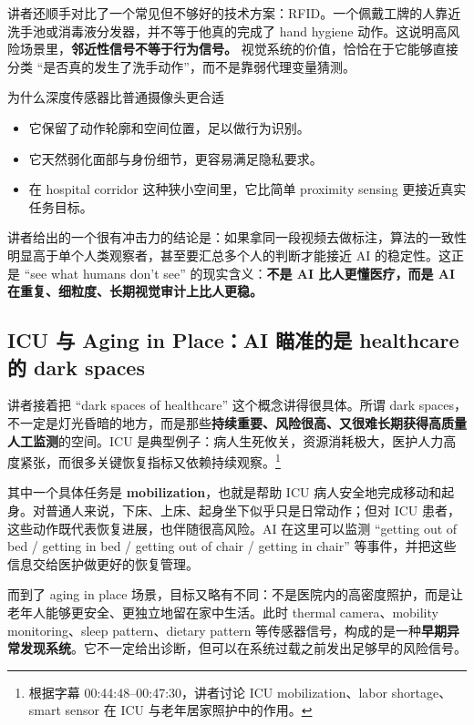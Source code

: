 讲者还顺手对比了一个常见但不够好的技术方案：RFID。一个佩戴工牌的人靠近洗手池或消毒液分发器，并不等于他真的完成了 hand hygiene 动作。这说明高风险场景里，\textbf{邻近性信号不等于行为信号。} 视觉系统的价值，恰恰在于它能够直接分类 ``是否真的发生了洗手动作''，而不是靠弱代理变量猜测。

\begin{importantbox}{为什么深度传感器比普通摄像头更合适}
\begin{itemize}
    \item 它保留了动作轮廓和空间位置，足以做行为识别。
    \item 它天然弱化面部与身份细节，更容易满足隐私要求。
    \item 在 hospital corridor 这种狭小空间里，它比简单 proximity sensing 更接近真实任务目标。
\end{itemize}
\end{importantbox}

讲者给出的一个很有冲击力的结论是：如果拿同一段视频去做标注，算法的一致性明显高于单个人类观察者，甚至要汇总多个人的判断才能接近 AI 的稳定性。这正是 ``see what humans don't see'' 的现实含义：\textbf{不是 AI 比人更懂医疗，而是 AI 在重复、细粒度、长期视觉审计上比人更稳。}

\subsection{ICU 与 Aging in Place：AI 瞄准的是 healthcare 的 dark spaces}

讲者接着把 ``dark spaces of healthcare'' 这个概念讲得很具体。所谓 dark spaces，不一定是灯光昏暗的地方，而是那些\textbf{持续重要、风险很高、又很难长期获得高质量人工监测}的空间。ICU 是典型例子：病人生死攸关，资源消耗极大，医护人力高度紧张，而很多关键恢复指标又依赖持续观察。\footnote{根据字幕 00:44:48--00:47:30，讲者讨论 ICU mobilization、labor shortage、smart sensor 在 ICU 与老年居家照护中的作用。}

其中一个具体任务是 \textbf{mobilization}，也就是帮助 ICU 病人安全地完成移动和起身。对普通人来说，下床、上床、起身坐下似乎只是日常动作；但对 ICU 患者，这些动作既代表恢复进展，也伴随很高风险。AI 在这里可以监测 ``getting out of bed / getting in bed / getting out of chair / getting in chair'' 等事件，并把这些信息交给医护做更好的恢复管理。

而到了 aging in place 场景，目标又略有不同：不是医院内的高密度照护，而是让老年人能够更安全、更独立地留在家中生活。此时 thermal camera、mobility monitoring、sleep pattern、dietary pattern 等传感器信号，构成的是一种\textbf{早期异常发现系统}。它不一定给出诊断，但可以在系统过载之前发出足够早的风险信号。

